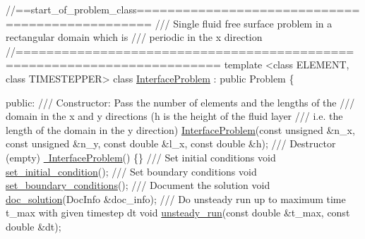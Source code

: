  
\begin{DoxyCodeInclude}
\textcolor{comment}{//==start\_of\_problem\_class================================================}
\textcolor{comment}{/// Single fluid free surface problem in a rectangular domain which is}
\textcolor{comment}{}\textcolor{comment}{/// periodic in the x direction}
\textcolor{comment}{}\textcolor{comment}{//========================================================================}
\textcolor{keyword}{template} <\textcolor{keyword}{class} ELEMENT, \textcolor{keyword}{class} TIMESTEPPER>
\textcolor{keyword}{class }\hyperlink{classInterfaceProblem}{InterfaceProblem} : \textcolor{keyword}{public} Problem
\{
 
\textcolor{keyword}{public}:
 \textcolor{comment}{}
\textcolor{comment}{ /// Constructor: Pass the number of elements and the lengths of the}
\textcolor{comment}{ /// domain in the x and y directions (h is the height of the fluid layer}
\textcolor{comment}{ /// i.e. the length of the domain in the y direction)}
\textcolor{comment}{} \hyperlink{classInterfaceProblem_a83023535d663a2a6558959f36bf6e1e7}{InterfaceProblem}(\textcolor{keyword}{const} \textcolor{keywordtype}{unsigned} &n\_x, \textcolor{keyword}{const} \textcolor{keywordtype}{unsigned} &n\_y, 
                  \textcolor{keyword}{const} \textcolor{keywordtype}{double} &l\_x, \textcolor{keyword}{const} \textcolor{keywordtype}{double} &h);
 \textcolor{comment}{}
\textcolor{comment}{ /// Destructor (empty)}
\textcolor{comment}{} \hyperlink{classInterfaceProblem_a90c191f8046069099b199743e7ce7111}{~InterfaceProblem}() \{\}
\textcolor{comment}{}
\textcolor{comment}{ /// Set initial conditions}
\textcolor{comment}{} \textcolor{keywordtype}{void} \hyperlink{classInterfaceProblem_a0d3af8378c4f0a6e38636be958c300d5}{set\_initial\_condition}();
\textcolor{comment}{}
\textcolor{comment}{ /// Set boundary conditions}
\textcolor{comment}{} \textcolor{keywordtype}{void} \hyperlink{classInterfaceProblem_a844445832ad7a32aa9f5d03ffdb40ebb}{set\_boundary\_conditions}();
\textcolor{comment}{}
\textcolor{comment}{ /// Document the solution}
\textcolor{comment}{} \textcolor{keywordtype}{void} \hyperlink{classInterfaceProblem_a49714e35e94f7d2af0b6ddd22b851f52}{doc\_solution}(DocInfo &doc\_info);
\textcolor{comment}{}
\textcolor{comment}{ /// Do unsteady run up to maximum time t\_max with given timestep dt}
\textcolor{comment}{} \textcolor{keywordtype}{void} \hyperlink{classInterfaceProblem_adf1f4e43d10939e4323e0e315b711085}{unsteady\_run}(\textcolor{keyword}{const} \textcolor{keywordtype}{double} &t\_max, \textcolor{keyword}{const} \textcolor{keywordtype}{double} &dt); 

\end{DoxyCodeInclude}


